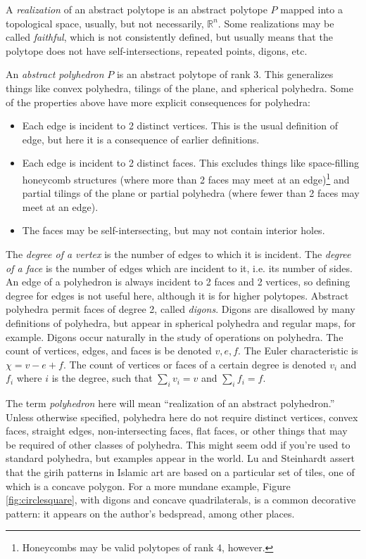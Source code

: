 \documentclass[12pt]{amsart}%
\begin{document}
A \textit{realization} of an abstract polytope is an abstract polytope $P$
mapped into a topological space, usually, but not necessarily, $\mathbb{R}^n$.
Some realizations may be called \textit{faithful}, which is not consistently
defined, but usually means that the polytope does not have self-intersections,
repeated points, digons, etc.

An \textit{abstract polyhedron} $P$ is an abstract polytope of rank 3. This
generalizes things like convex polyhedra, tilings of the plane,
and spherical polyhedra. Some of the properties above have more
explicit consequences for polyhedra: \cite{grunbaum03}
\begin{itemize}
  \item Each edge is incident to 2 distinct vertices. This is the usual
  definition of edge, but here it is a consequence of earlier definitions.
  \item Each edge is incident to 2 distinct faces. This excludes things like
  space-filling honeycomb structures (where more than 2 faces may meet at an
  edge)\footnote{Honeycombs may be valid polytopes of rank 4, however.} and
  partial tilings of the plane or partial polyhedra (where fewer than 2 faces may meet at an edge).
  \item The faces may be self-intersecting, but may not contain interior holes.
\end{itemize}
The \textit{degree of a vertex} is the number of edges to which it is incident.
The \textit{degree of a face} is the number of edges which are incident to it,
i.e. its number of sides. An edge of a polyhedron is always incident to 2
faces and 2 vertices, so defining degree for edges is not useful here, although
it is for higher polytopes.
Abstract polyhedra permit faces of degree 2, called \textit{digons}. Digons are
disallowed by many definitions of polyhedra, but appear in spherical polyhedra
and regular maps, for example. Digons occur naturally in the study of
operations on polyhedra. The count of vertices, edges, and faces is be denoted
$v, e, f$. The Euler characteristic is $\chi = v - e + f$. The count of
vertices or faces of a certain degree is denoted $v_i$ and $f_i$ where $i$ is
the degree, such that $\sum_i v_i = v$ and $\sum_i f_i = f$.

The term \textit{polyhedron} here will mean ``realization of an abstract
polyhedron.'' Unless otherwise specified, polyhedra here do not require
distinct vertices, convex faces, straight edges, non-intersecting faces, flat
faces, or other things that may be required of other classes of polyhedra. This
might seem odd if you're used to standard polyhedra, but examples appear in the
world. Lu and Steinhardt \cite{lu07} assert that the girih patterns in Islamic
art are based on a particular set of tiles, one of which is a concave polygon.
For a more mundane example, Figure \ref{fig:circlesquare}, with digons and
concave quadrilaterals, is a common decorative pattern: it appears on the
author's bedspread, among other places.
\end{document}
